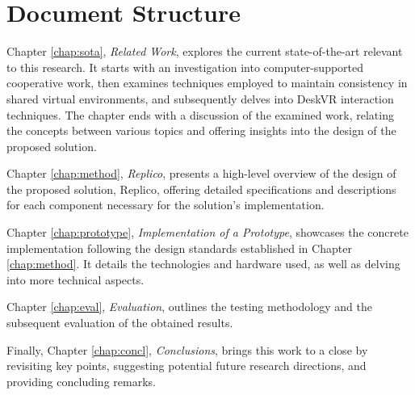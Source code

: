 \section{Document Structure}

Chapter \ref{chap:sota}, \textit{Related Work}, explores the current state-of-the-art relevant to this research. It starts with an investigation into computer-supported cooperative work, then examines techniques employed to maintain consistency in shared virtual environments, and subsequently delves into DeskVR interaction techniques. The chapter ends with a discussion of the examined work, relating the concepts between various topics and offering insights into the design of the proposed solution.

Chapter \ref{chap:method}, \textit{Replico}, presents a high-level overview of the design of the proposed solution, Replico, offering detailed specifications and descriptions for each component necessary for the solution's implementation.

Chapter \ref{chap:prototype}, \textit{Implementation of a Prototype}, showcases the concrete implementation following the design standards established in Chapter \ref{chap:method}. It details the technologies and hardware used, as well as delving into more technical aspects.

Chapter \ref{chap:eval}, \textit{Evaluation}, outlines the testing methodology and the subsequent evaluation of the obtained results.

Finally, Chapter \ref{chap:concl}, \textit{Conclusions}, brings this work to a close by revisiting key points, suggesting potential future research directions, and providing concluding remarks.

